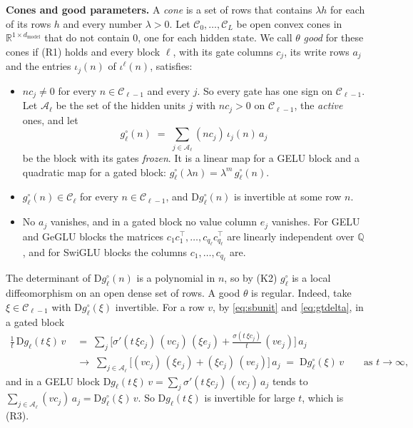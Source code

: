 \documentclass[10pt]{article}
\theoremstyle{definition}
\theoremstyle{remark}
\newcommand{\R}{\mathbb{R}}
\newcommand{\dm}{d_{\mathrm{model}}}
\newcommand{\Der}{\mathrm{D}}
\newcommand{\para}[1]{\smallskip\noindent\textbf{#1}\hspace{0.5em}}
\begin{document}
\para{Cones and good parameters.} A \emph{cone} is a set of rows that contains $\lambda h$ for each of its rows $h$ and every number $\lambda > 0$. Let $\mathcal C_0, \dots, \mathcal C_L$ be open convex cones in $\R^{1\times\dm}$ that do not contain $0$, one for each hidden state. We call $\theta$ \emph{good} for these cones if (R1) holds and every block $\ell$, with its gate columns $c_j$, its write rows $a_j$ and the entries $\iota_j(n)$ of $\iota^{\ell}(n)$, satisfies:
\begin{itemize}[leftmargin=2.9em]
\item[(K1)] $nc_j \neq 0$ for every $n \in \mathcal C_{\ell-1}$ and every $j$. So every gate has one sign on $\mathcal C_{\ell-1}$. Let $\mathcal A_\ell$ be the set of the hidden units $j$ with $nc_j > 0$ on $\mathcal C_{\ell-1}$, the \emph{active} ones, and let
\[
g^\circ_\ell(n) \;=\; \sum_{j\in\mathcal A_\ell}(nc_j)\,\iota_j(n)\,a_j
\]
be the block with its gates \emph{frozen}. It is a linear map for a GELU block and a quadratic map for a gated block: $g^\circ_\ell(\lambda n) = \lambda^m\,g^\circ_\ell(n)$.
\item[(K2)] $g^\circ_\ell(n) \in \mathcal C_\ell$ for every $n \in \mathcal C_{\ell-1}$, and $\Der g^\circ_\ell(n)$ is invertible at some row $n$.
\item[(K3)] No $a_j$ vanishes, and in a gated block no value column $e_j$ vanishes. For GELU and GeGLU blocks the matrices $c_1c_1^\top, \dots, c_{q_\ell}c_{q_\ell}^\top$ are linearly independent over $\mathbb Q$, and for SwiGLU blocks the columns $c_1, \dots, c_{q_\ell}$ are.
\end{itemize}
The determinant of $\Der g^\circ_\ell(n)$ is a polynomial in $n$, so by (K2) $g^\circ_\ell$ is a local diffeomorphism on an open dense set of rows. A good $\theta$ is regular. Indeed, take $\xi \in \mathcal C_{\ell-1}$ with $\Der g^\circ_\ell(\xi)$ invertible. For a row $v$, by \eqref{eq:sbunit} and \eqref{eq:gtdelta}, in a gated block
\begin{align*}
\frac1t\,\Der g_\ell(t\,\xi)\,v \;&=\; \sum_j\Big[\sigma'(t\,\xi c_j)\,(vc_j)\,(\xi e_j) + \frac{\sigma(t\,\xi c_j)}{t}\,(ve_j)\Big]\,a_j \\
&\longrightarrow\; \sum_{j\in\mathcal A_\ell}\Big[(vc_j)\,(\xi e_j) + (\xi c_j)\,(ve_j)\Big]\,a_j \;=\; \Der g^\circ_\ell(\xi)\,v \qquad\text{as } t \to \infty ,
\end{align*}
and in a GELU block $\Der g_\ell(t\,\xi)\,v = \sum_j\sigma'(t\,\xi c_j)\,(vc_j)\,a_j$ tends to $\sum_{j\in\mathcal A_\ell}(vc_j)\,a_j = \Der g^\circ_\ell(\xi)\,v$. So $\Der g_\ell(t\,\xi)$ is invertible for large $t$, which is (R3).
\end{document}

